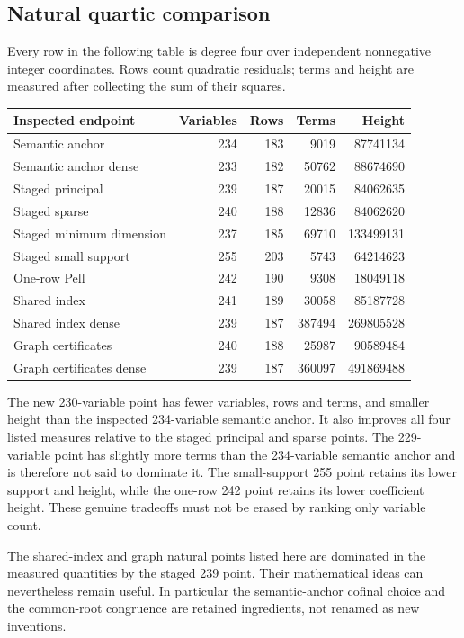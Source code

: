\subsection{Natural quartic comparison}
Every row in the following table is degree four over independent nonnegative integer coordinates. Rows count quadratic residuals; terms and height are measured after collecting the sum of their squares.
\begin{center}\small
\begin{tabular}{@{}lrrrr@{}}\toprule
Inspected endpoint&Variables&Rows&Terms&Height\\\midrule
Semantic anchor&234&183&9019&87741134\\
Semantic anchor dense&233&182&50762&88674690\\
Staged principal&239&187&20015&84062635\\
Staged sparse&240&188&12836&84062620\\
Staged minimum dimension&237&185&69710&133499131\\
Staged small support&255&203&5743&64214623\\
One-row Pell&242&190&9308&18049118\\
Shared index&241&189&30058&85187728\\
Shared index dense&239&187&387494&269805528\\
Graph certificates&240&188&25987&90589484\\
Graph certificates dense&239&187&360097&491869488\\\bottomrule
\end{tabular}\end{center}
The new 230-variable point has fewer variables, rows and terms, and smaller height than the inspected 234-variable semantic anchor. It also improves all four listed measures relative to the staged principal and sparse points. The 229-variable point has slightly more terms than the 234-variable semantic anchor and is therefore not said to dominate it. The small-support 255 point retains its lower support and height, while the one-row 242 point retains its lower coefficient height. These genuine tradeoffs must not be erased by ranking only variable count.

The shared-index and graph natural points listed here are dominated in the measured quantities by the staged 239 point. Their mathematical ideas can nevertheless remain useful. In particular the semantic-anchor cofinal choice and the common-root congruence are retained ingredients, not renamed as new inventions.

